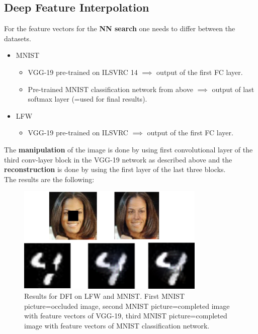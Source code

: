 \documentclass[
     11pt,         %
     a4paper,      %
     oneside,
     ]{article}
\begin{document}
\subsection{Deep Feature Interpolation}
For the feature vectors for the \textbf{NN search} one needs to differ between the datasets.
\begin{itemize}
  \item MNIST
  \begin{itemize}
    \item VGG-19 pre-trained on ILSVRC 14 $\implies$ output of the first FC layer.
    \item Pre-trained MNIST classification network from above $\implies$ output of last softmax layer (=used for final results).
  \end{itemize}
  \item LFW
  \begin{itemize}
    \item VGG-19 pre-trained on ILSVRC $\implies$ output of the first FC layer.
  \end{itemize}
\end{itemize}
The \textbf{manipulation} of the image is done by using first convolutional layer of the third conv-layer block in the VGG-19 network as described above and the \textbf{reconstruction} is done by using the first layer of the last three blocks.\\
The results are the following:
  \begin{figure}[H]
    \begin{center}
      \includegraphics[width=0.8\textwidth]{images/DFI-final2.png}
      \caption{Results for DFI on LFW and MNIST. First MNIST picture=occluded image, second MNIST picture=completed image with feature vectors of VGG-19, third MNIST picture=completed image with feature vectors of MNIST classification network.}
    \end{center}
  \end{figure}
\end{document}
